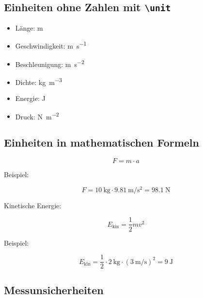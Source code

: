 \documentclass[11pt,a4paper]{scrartcl}
\begin{document}
	\subsection{Einheiten ohne Zahlen mit \texttt{\textbackslash unit}}
	
	\begin{itemize}
		\item Länge: 
			\unit{\metre}
		\item Geschwindigkeit:
			\unit{\metre\per\second}
		\item Beschleunigung:
			\unit{\metre\per\second\squared}
		\item Dichte:
			\unit{\kilogram\per\cubic\metre}
		\item Energie:
			\unit{\joule}
		\item Druck:
			\unit{\newton\per\square\metre}
	\end{itemize}
	
	\subsection{Einheiten in mathematischen Formeln}
	
	\begin{equation}
		F = m \cdot a
	\end{equation}
	
	Beispiel:
	
	\begin{equation}
		F =
		\qty{10}{\kilogram}
		\cdot
		\qty{9.81}{\metre\per\second\squared}
		=
		\qty{98.1}{\newton}
	\end{equation}
	
	Kinetische Energie:
	
	\begin{equation}
		E_{\mathrm{kin}} =
		\frac{1}{2}mv^2
	\end{equation}
	
	Beispiel:
	
	\begin{equation}
		E_{\mathrm{kin}}
		=
		\frac{1}{2}
		\cdot \qty{2}{\kilogram}
		\cdot
		\left(
		\qty{3}{\metre\per\second}
		\right)^2
		=
		\qty{9}{\joule}
	\end{equation}
	
	\subsection{Messunsicherheiten}
	
\end{document}
